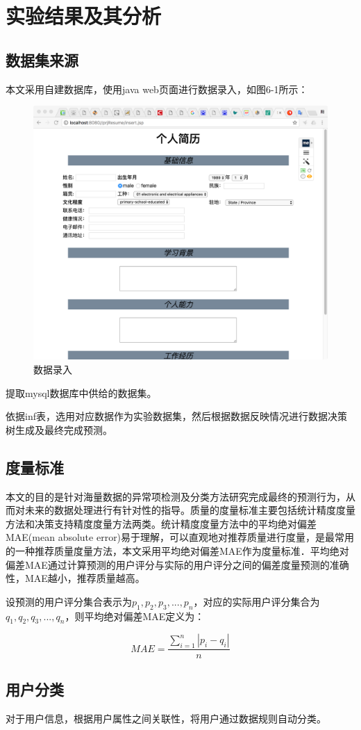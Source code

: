 \section{实验结果及其分析}

\subsection{数据集来源}
本文采用自建数据库，使用java web页面进行数据录入，如图6-1所示：

\begin{figure}[thbp!]
	\centering
	\includegraphics[width=0.4\linewidth]{figure/6-1}
	\caption{数据录入}
	\label{fig:6-1}
\end{figure}

提取mysql数据库中供给的数据集。

依据inf表，选用对应数据作为实验数据集，然后根据数据反映情况进行数据决策树生成及最终完成预测。

\subsection{度量标准}
本文的目的是针对海量数据的异常项检测及分类方法研究完成最终的预测行为，从而对未来的数据处理进行有针对性的指导。质量的度量标准主要包括统计精度度量方法和决策支持精度度量方法两类。统计精度度量方法中的平均绝对偏差MAE(mean absolute error)易于理解，可以直观地对推荐质量进行度量，是最常用的一种推荐质量度量方法，本文采用平均绝对偏差MAE作为度量标准．平均绝对偏差MAE通过计算预测的用户评分与实际的用户评分之间的偏差度量预测的准确性，MAE越小，推荐质量越高。

设预测的用户评分集合表示为${p_1,p_2,p_3,...,p_n}$，对应的实际用户评分集合为${q_1,q_2,q_3,...,q_n}$，则平均绝对偏差MAE定义为：

\begin{equation}
MAE=\frac{\sum_{i=1}^n |p_i-q_i|}{n}
\end{equation}

\subsection{用户分类}
对于用户信息，根据用户属性之间关联性，将用户通过数据规则自动分类。

